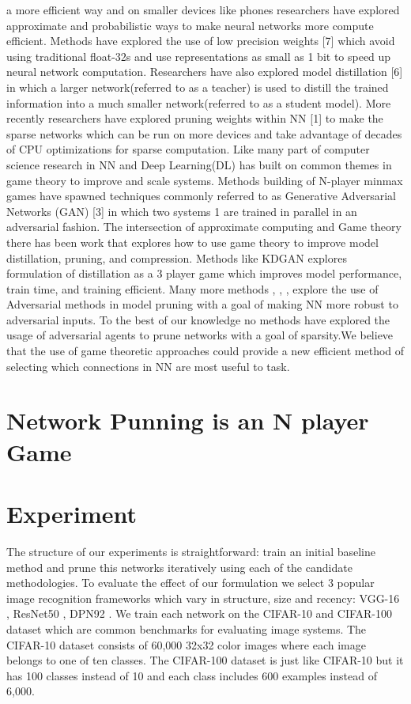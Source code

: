 \documentclass{article}
\begin{document}
a more efficient way and on smaller devices like phones researchers have explored
approximate and probabilistic ways to make neural networks more compute efficient. Methods have explored the use of low precision weights [7] which avoid
using traditional float-32s and use representations as small as 1 bit to speed
up neural network computation. Researchers have also explored model distillation [6] in which a larger network(referred to as a teacher) is used to distill
the trained information into a much smaller network(referred to as a student
model). More recently researchers have explored pruning weights within NN
[1] to make the sparse networks which can be run on more devices and take
advantage of decades of CPU optimizations for sparse computation.
Like many part of computer science research in NN and Deep Learning(DL) has
built on common themes in game theory to improve and scale systems. Methods building of N-player minmax games have spawned techniques commonly
referred to as Generative Adversarial Networks (GAN) [3] in which two systems
1
are trained in parallel in an adversarial fashion. The intersection of approximate computing and Game theory there has been work that explores how to use
game theory to improve model distillation, pruning, and compression. Methods
like KDGAN \cite{Wang2018KDGANKD} explores formulation of distillation as a 3 player game which
improves model performance, train time, and training efficient. Many more
methods \cite{Guo2018SparseDW} \cite{Dhillon2018StochasticAP}, \cite{Sehwag2020OnPA}, \cite{Xie2020BlindAP}, explore the use of Adversarial methods in model
pruning with a goal of making NN more robust to adversarial inputs. To the best
of our knowledge no methods have explored the usage of adversarial agents to
prune networks with a goal of sparsity.We believe that the use of game theoretic
approaches could provide a new efficient method of selecting which connections
in NN are most useful to task.
\section{Network Punning is an N player Game}
\section{Experiment}
The structure of our experiments is straightforward: train an initial baseline method and prune this networks iteratively using each of the candidate methodologies. To evaluate the effect of our formulation we select 3 popular image recognition frameworks which vary in structure, size and recency: VGG-16 \cite{Simonyan2015VeryDC}, ResNet50 \cite{He2016DeepRL}, DPN92 \cite{Chen2017DualPN}. We train each network on the CIFAR-10 \cite{Krizhevsky2009LearningML} and CIFAR-100 \cite{CIFAR-10} dataset which are common benchmarks for evaluating image systems. The CIFAR-10 dataset consists of 60,000 32x32 color images where each image belongs to one of ten classes. The CIFAR-100 dataset is just like CIFAR-10 but it has 100 classes instead of 10 and each class includes 600 examples instead of 6,000. \\
\end{document}
